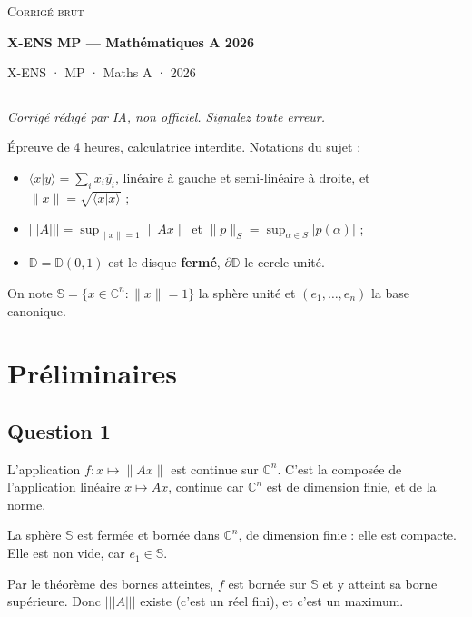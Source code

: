 \documentclass[11pt,a4paper]{article}
\providecommand{\tightlist}{\setlength{\itemsep}{0pt}\setlength{\parskip}{0pt}}
\begin{document}
\thispagestyle{plain}
\begin{center}
  {\small\scshape Corrigé brut}\par\smallskip
  {\LARGE\bfseries X-ENS MP — Mathématiques A 2026\par}\medskip
  {\large X-ENS · MP · Maths A · 2026\par}
\end{center}
\vspace{2pt}\hrule\vspace{8pt}

\emph{Corrigé rédigé par IA, non officiel. Signalez toute erreur.}

Épreuve de 4 heures, calculatrice interdite. Notations du sujet :

\begin{itemize}
\tightlist
\item
  \(\langle x|y\rangle=\sum_i x_i\overline{y_i}\), linéaire à gauche et semi-linéaire à droite, et \(\|x\|=\sqrt{\langle x|x\rangle}\) ;
\item
  \(\vert\!\vert\!\vert A\vert\!\vert\!\vert =\sup_{\|x\|=1}\|Ax\|\) et \(\|p\|_S=\sup_{\alpha\in S}|p(\alpha)|\) ;
\item
  \(\mathbb D=\mathbb D(0,1)\) est le disque \textbf{fermé}, \(\partial\mathbb D\) le cercle unité.
\end{itemize}

On note \(\mathbb S=\{x\in\mathbb C^n:\|x\|=1\}\) la sphère unité et \((e_1,\dots,e_n)\) la base canonique.

\hypertarget{pruxe9liminaires}{%
\section{Préliminaires}\label{pruxe9liminaires}}

\hypertarget{question-1}{%
\subsection{Question 1}\label{question-1}}

L'application \(f:x\mapsto\|Ax\|\) est continue sur \(\mathbb C^n\). C'est la composée de l'application linéaire \(x\mapsto Ax\), continue car \(\mathbb C^n\) est de dimension finie, et de la norme.

La sphère \(\mathbb S\) est fermée et bornée dans \(\mathbb C^n\), de dimension finie : elle est compacte. Elle est non vide, car \(e_1\in\mathbb S\).

Par le théorème des bornes atteintes, \(f\) est bornée sur \(\mathbb S\) et y atteint sa borne supérieure. Donc \(\vert\!\vert\!\vert A\vert\!\vert\!\vert\) existe (c'est un réel fini), et c'est un maximum.
\end{document}

